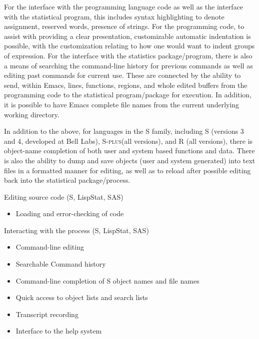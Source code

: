 \documentclass{article}
\newcommand*{\Splus}{\textsc{S-plus}}
\begin{document}
For the interface with the programming language code as well as the
interface with the statistical program, this includes syntax
highlighting to denote assignment, reserved words, presence of
strings.  For the programming code, to assist with providing a clear
presentation, customizable automatic indentation is possible, with the
customization relating to how one would want to indent groups of
expression.  For the interface with the statistics package/program,
there is also a means of searching the command-line history for
previous commands as well as editing past commands for current use.
These are connected by the ability to send, within Emacs, lines,
functions, regions, and whole edited buffers from the programming code
to the statistical program/package for execution.  In addition, it is
possible to have Emacs complete file names from the current underlying
working directory.

In addition to the above, for languages in the S family, including S
(versions 3 and 4, developed at Bell Labs), \Splus (all versions), and
R (all versions), there is object-name completion of both user and
system based functions and data.  There is also the ability to dump
and save objects (user and system generated) into text files in a
formatted manner for editing, as well as to reload after possible
editing back into the statistical package/process.

Editing source code (S, LispStat, SAS)
\begin{itemize}
\item Loading and error-checking of code
\end{itemize}

Interacting with the process (S, LispStat, SAS)
\begin{itemize}
\item Command-line editing
\item Searchable Command history
\item Command-line completion of S object names and file names
\item Quick access to object lists and search lists
\item Transcript recording
\item Interface to the help system
\end{itemize}
\end{document}
